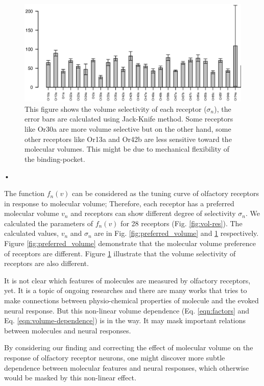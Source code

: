 \documentclass[11pt]{paper} %
\begin{document}
\begin{figure}
	\includegraphics[width=\textwidth]{fig/std-vol}
	\caption{This figure shows the volume selectivity of each receptor ($\sigma_n$), the error bars are calculated using Jack-Knife method.
	Some receptors like Or30a are more volume selective but on the other hand, some other receptors like Or13a and Or42b are less sensitive toward the molecular volumes.
	This might be due to mechanical flexibility of the binding-pocket.}
	\label{fig:volume_selectivity}
\end{figure}•

The function $f_n(v)$ can be considered as the tuning curve of olfactory receptors in response to molecular volume;
Therefore, each receptor has a preferred molecular volume $v_n$ and receptors can show different degree of selectivity $\sigma_n$.
We calculated the parameters of $f_n(v)$ for 28 receptors (Fig. \ref{fig:vol-res}). 
The calculated values, $v_n$ and $\sigma_n$ are in Fig. \ref{fig:preferred_volume} and \ref{fig:volume_selectivity} respectively.
Figure \ref{fig:preferred_volume} demonstrate that the molecular volume preference of receptors are different. 
Figure \ref{fig:volume_selectivity} illustrate that the volume selectivity of receptors are also different.

It is not clear which features of molecules are measured by olfactory receptors, yet. 
It is a topic of ongoing researches 
and there are many works that tries to make connections between physio-chemical properties of molecule 
and the evoked neural response. 
But this non-linear volume dependence (Eq. \ref{eqn:factors} and Eq. \ref{eqn:volume-dependence}) is in the way. 
It may mask important relations between molecules and neural responses.

By considering our finding and correcting the effect of molecular volume on the response of olfactory receptor neurons, 
one might discover more subtle dependence between molecular features and neural responses, 
which otherwise would be masked by this non-linear effect.
\end{document}
